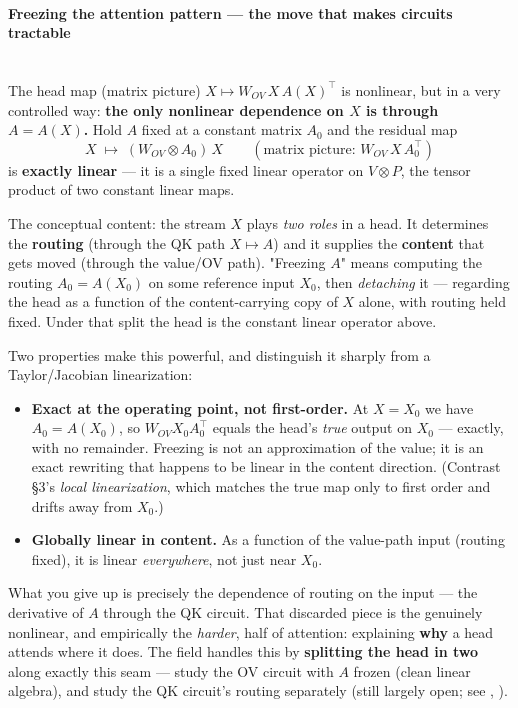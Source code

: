 \paragraph*{Freezing the attention pattern --- the move that makes circuits tractable}\mbox{}\\

The head map (matrix picture) $X \mapsto W_{OV}\,X\,A(X)^\top$ is nonlinear, but in a very controlled way: \textbf{the only nonlinear dependence on $X$ is through $A = A(X)$.} Hold $A$ fixed at a constant matrix $A_0$ and the residual map \[ X \;\longmapsto\; (W_{OV}\otimes A_0)\,X \qquad(\text{matrix picture: } W_{OV}\, X\, A_0^\top) \] is \textbf{exactly linear} --- it is a single fixed linear operator on $V\otimes P$, the tensor product of two constant linear maps.


The conceptual content: the stream $X$ plays \emph{two roles} in a head. It determines the \textbf{routing} (through the QK path $X \mapsto A$) and it supplies the \textbf{content} that gets moved (through the value/OV path). "Freezing $A$" means computing the routing $A_0 = A(X_0)$ on some reference input $X_0$, then \emph{detaching} it --- regarding the head as a function of the content-carrying copy of $X$ alone, with routing held fixed. Under that split the head is the constant linear operator above.


Two properties make this powerful, and distinguish it sharply from a Taylor/Jacobian linearization:

\begin{itemize}
\item \textbf{Exact at the operating point, not first-order.} At $X = X_0$ we have $A_0 = A(X_0)$, so $W_{OV} X_0 A_0^\top$ equals the head's \emph{true} output on $X_0$ --- exactly, with no remainder. Freezing is not an approximation of the value; it is an exact rewriting that happens to be linear in the content direction. (Contrast §3's \emph{local linearization}, which matches the true map only to first order and drifts away from $X_0$.)
\item \textbf{Globally linear in content.} As a function of the value-path input (routing fixed), it is linear \emph{everywhere}, not just near $X_0$.
\end{itemize}

What you give up is precisely the dependence of routing on the input --- the derivative of $A$ through the QK circuit. That discarded piece is the genuinely nonlinear, and empirically the \emph{harder}, half of attention: explaining \textbf{why} a head attends where it does. The field handles this by \textbf{splitting the head in two} along exactly this seam --- study the OV circuit with $A$ frozen (clean linear algebra), and study the QK circuit's routing separately (still largely open; see \textcite{tracing-attention-feature-interactions}, \textcite{progress-on-attention}).


